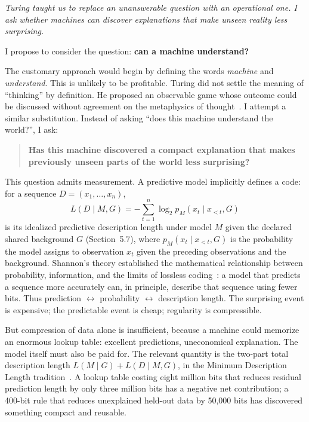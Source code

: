 \documentclass[11pt]{article}
\begin{document}
\textit{Turing taught us to replace an unanswerable question with an operational one. I ask whether machines can discover explanations that make unseen reality less surprising.}

I propose to consider the question: \textbf{can a machine understand?}

The customary approach would begin by defining the words \textit{machine} and \textit{understand}. This is unlikely to be profitable. Turing did not settle the meaning of ``thinking'' by definition. He proposed an observable game whose outcome could be discussed without agreement on the metaphysics of thought~\cite{turing1950}. I attempt a similar substitution. Instead of asking ``does this machine understand the world?'', I ask:
\begin{quote}
\textbf{Has this machine discovered a compact explanation that makes previously unseen parts of the world less surprising?}
\end{quote}
This question admits measurement. A predictive model implicitly defines a code: for a sequence \(D=(x_1,\ldots,x_n)\),
\[
L(D\mid M,G)
=
-\sum_{t=1}^{n}
\log_2 p_M(x_t\mid x_{<t},G)
\]
is its idealized predictive description length under model \(M\) given the declared shared background \(G\) (Section~5.7), where \(p_M(x_t\mid x_{<t},G)\) is the probability the model assigns to observation \(x_t\) given the preceding observations and the background. Shannon's theory established the mathematical relationship between probability, information, and the limits of lossless coding~\cite{shannon1948}: a model that predicts a sequence more accurately can, in principle, describe that sequence using fewer bits. Thus prediction \(\longleftrightarrow\) probability \(\longleftrightarrow\) description length. The surprising event is expensive; the predictable event is cheap; regularity is compressible.

But compression of data alone is insufficient, because a machine could memorize an enormous lookup table: excellent predictions, uneconomical explanation. The model itself must also be paid for. The relevant quantity is the two-part total description length \(L(M\mid G)+L(D\mid M,G)\), in the Minimum Description Length tradition~\cite{rissanen1978,grunwald2005}. A lookup table costing eight million bits that reduces residual prediction length by only three million bits has a negative net contribution; a 400-bit rule that reduces unexplained held-out data by 50,000 bits has discovered something compact and reusable.
\end{document}
